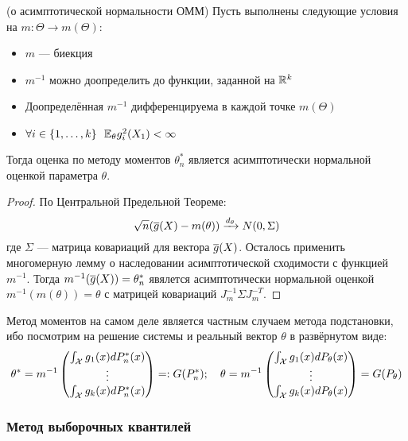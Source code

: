 \begin{theorem} (о асимптотической нормальности ОММ)
	Пусть выполнены следующие условия на $m \colon \Theta \to m(\Theta)$:
	\begin{itemize}
		\item $m$ --- биекция
		
		\item $m^{-1}$ можно доопределить до функции, заданной на $\mathbb{R}^k$
		
		\item Доопределённая $m^{-1}$ дифференцируема в каждой точке $m(\Theta)$
		
		\item $\forall i \in \range{1}{k}\ \ \E_\theta g_i^2(X_1) < \infty$
	\end{itemize}
	Тогда оценка по методу моментов $\theta_n^*$ является асимптотически нормальной оценкой параметра $\theta$.
\end{theorem}


\begin{proof}
	По Центральной Предельной Теореме:
	\[
		\sqrt{n}(\overline{g}(X) - m(\theta)) \xrightarrow{d_\theta} N(0, \Sigma)
	\]
	где $\Sigma$ --- матрица ковариаций для вектора $\overline{g}(X)$. Осталось применить многомерную лемму о наследовании асимптотической сходимости с функцией $m^{-1}$. Тогда $m^{-1}(\overline{g}(X)) = \theta_n^*$ явялется асимптотически нормальной оценкой $m^{-1}(m(\theta)) = \theta$ с матрицей ковариаций $J_m^{-1}\Sigma J_m^{-T}$.
\end{proof}

\begin{note}
	Метод моментов на самом деле является частным случаем метода подстановки, ибо посмотрим на решение системы и реальный вектор $\theta$ в развёрнутом виде:
	\[
		\theta^* = m^{-1} \begin{pmatrix}
			\int_{\mathcal{X}} g_1(x)dP_n^*(x)
			\\
			\vdots
			\\
			\int_{\mathcal{X}} g_k(x)dP_n^*(x)
		\end{pmatrix}
		=: G(P_n^*); \quad \theta = m^{-1} \begin{pmatrix}
			\int_{\mathcal{X}} g_1(x)dP_\theta(x)
			\\
			\vdots
			\\
			\int_{\mathcal{X}} g_k(x)dP_\theta(x)
		\end{pmatrix}
		= G(P_\theta)
	\]
\end{note}

\subsubsection*{Метод выборочных квантилей}

